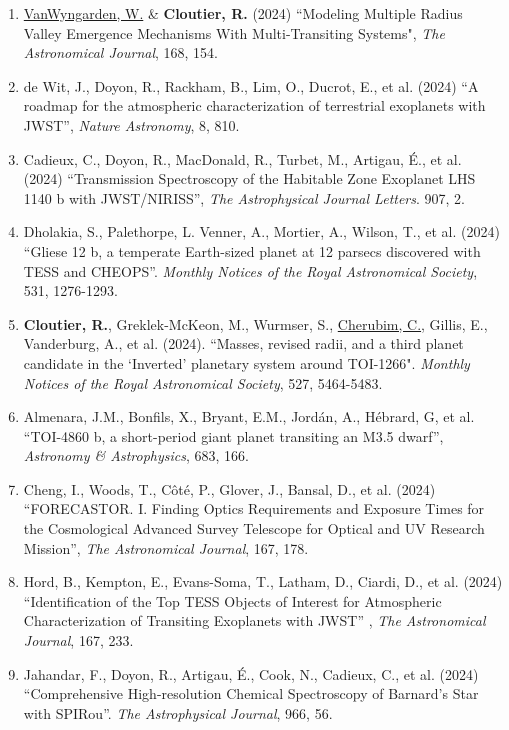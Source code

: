 \documentclass[12pt]{article}
\begin{document}
\begin{itemize}
\begin{enumerate}
\item \underline{VanWyngarden, W.} \& {\bf Cloutier, R.} (2024) ``Modeling Multiple Radius Valley Emergence Mechanisms With Multi-Transiting Systems", {\it The Astronomical Journal}, 168, 154.
\item de Wit, J., Doyon, R., Rackham, B., Lim, O., Ducrot, E., et al. (2024) ``A roadmap for the atmospheric characterization of terrestrial exoplanets with JWST'', {\it Nature Astronomy}, 8, 810.
\item Cadieux, C., Doyon, R., MacDonald, R., Turbet, M., Artigau, \'E., et al. (2024) ``Transmission Spectroscopy of the Habitable Zone Exoplanet LHS 1140 b with JWST/NIRISS'', {\it The Astrophysical Journal Letters}. 907, 2.
\item Dholakia, S., Palethorpe, L. Venner, A., Mortier, A., Wilson, T., et al. (2024) ``Gliese 12 b, a temperate Earth-sized planet at 12 parsecs discovered with TESS and CHEOPS''.  {\it Monthly Notices of the Royal Astronomical Society}, 531, 1276-1293.
\item {\bf Cloutier, R.}, Greklek-McKeon, M., Wurmser, S., \underline{Cherubim, C.}, Gillis, E., Vanderburg, A., et al. (2024). ``Masses, revised radii, and a third planet candidate in the ‘Inverted’ planetary system around TOI-1266". {\it Monthly Notices of the Royal Astronomical Society}, 527, 5464-5483.
\item Almenara, J.M., Bonfils, X., Bryant, E.M., Jord\'an, A., H\'ebrard, G, et al. ``TOI-4860 b, a short-period giant planet transiting an M3.5 dwarf'', {\it Astronomy \& Astrophysics}, 683, 166.
\item Cheng, I., Woods, T., C\^ot\'e, P., Glover, J., Bansal, D., et al. (2024) ``FORECASTOR. I. Finding Optics Requirements and Exposure Times for the Cosmological Advanced Survey Telescope for Optical and UV Research Mission'', {\it The Astronomical Journal}, 167, 178.
\item Hord, B., Kempton, E., Evans-Soma, T., Latham, D., Ciardi, D., et al. (2024) ``Identification of the Top TESS Objects of Interest for Atmospheric Characterization of Transiting Exoplanets with JWST'' , {\it The Astronomical Journal}, 167, 233.
\item Jahandar, F., Doyon, R., Artigau, \'E., Cook, N., Cadieux, C., et al. (2024) ``Comprehensive High-resolution Chemical Spectroscopy of Barnard's Star with SPIRou''. {\it The Astrophysical Journal}, 966, 56.

\end{enumerate}
\end{itemize}
\end{document}

